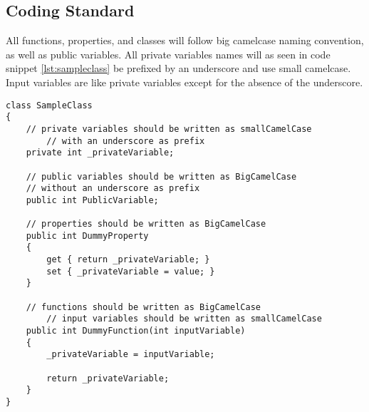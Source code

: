 \subsection{Coding Standard}
\label{subsec:coding_standard}
All functions, properties, and classes will follow big camelcase naming convention, as well as public variables.
All private variables names will as seen in code snippet \ref{lst:sampleclass} be prefixed by an underscore and use small camelcase.
Input variables are like private variables except for the absence of the underscore.


\begin{lstlisting}[style=sourceCode, caption=\myCaption{SampleClass.cs}, label=lst:sampleclass]
class SampleClass
{
    // private variables should be written as smallCamelCase
		// with an underscore as prefix
    private int _privateVariable;

    // public variables should be written as BigCamelCase
    // without an underscore as prefix
    public int PublicVariable;

    // properties should be written as BigCamelCase
    public int DummyProperty
    {
        get { return _privateVariable; }
        set { _privateVariable = value; }
    }

    // functions should be written as BigCamelCase
		// input variables should be written as smallCamelCase
    public int DummyFunction(int inputVariable)
    {
        _privateVariable = inputVariable;

        return _privateVariable;
    }
}
\end{lstlisting}